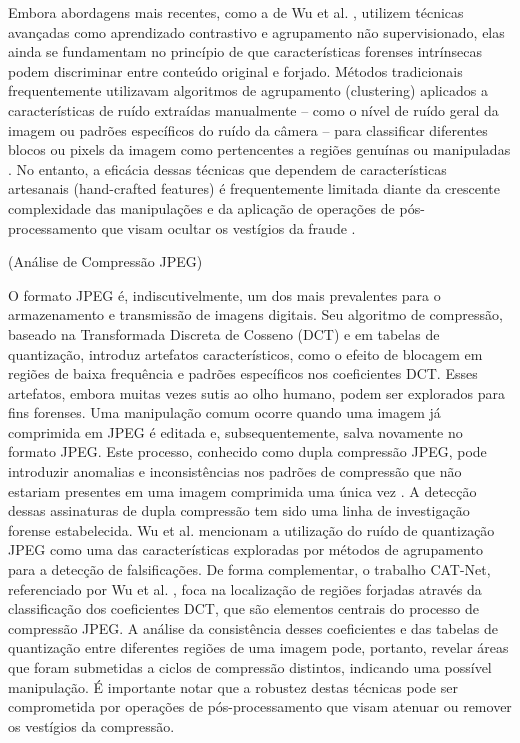 Embora abordagens mais recentes, como a de Wu et al. \cite{wu2023rethinking}, utilizem técnicas avançadas como aprendizado contrastivo e agrupamento não supervisionado, elas ainda se fundamentam no princípio de que características forenses intrínsecas podem discriminar entre conteúdo original e forjado. Métodos tradicionais frequentemente utilizavam algoritmos de agrupamento (clustering) aplicados a características de ruído extraídas manualmente – como o nível de ruído geral da imagem ou padrões específicos do ruído da câmera – para classificar diferentes blocos ou pixels da imagem como pertencentes a regiões genuínas ou manipuladas \cite{wu2023rethinking}. No entanto, a eficácia dessas técnicas que dependem de características artesanais (hand-crafted features) é frequentemente limitada diante da crescente complexidade das manipulações e da aplicação de operações de pós-processamento que visam ocultar os vestígios da fraude \cite{wu2023rethinking}.

\subsubsubsection(Análise de Compressão JPEG)

O formato JPEG é, indiscutivelmente, um dos mais prevalentes para o armazenamento e transmissão de imagens digitais. Seu algoritmo de compressão, baseado na Transformada Discreta de Cosseno (DCT) e em tabelas de quantização, introduz artefatos característicos, como o efeito de blocagem em regiões de baixa frequência e padrões específicos nos coeficientes DCT. Esses artefatos, embora muitas vezes sutis ao olho humano, podem ser explorados para fins forenses. Uma manipulação comum ocorre quando uma imagem já comprimida em JPEG é editada e, subsequentemente, salva novamente no formato JPEG. Este processo, conhecido como dupla compressão JPEG, pode introduzir anomalias e inconsistências nos padrões de compressão que não estariam presentes em uma imagem comprimida uma única vez \cite{zhou2018manipulation}. A detecção dessas assinaturas de dupla compressão tem sido uma linha de investigação forense estabelecida. Wu et al. \cite{wu2023rethinking} mencionam a utilização do ruído de quantização JPEG como uma das características exploradas por métodos de agrupamento para a detecção de falsificações. De forma complementar, o trabalho CAT-Net, referenciado por Wu et al. \cite{wu2023rethinking}, foca na localização de regiões forjadas através da classificação dos coeficientes DCT, que são elementos centrais do processo de compressão JPEG. A análise da consistência desses coeficientes e das tabelas de quantização entre diferentes regiões de uma imagem pode, portanto, revelar áreas que foram submetidas a ciclos de compressão distintos, indicando uma possível manipulação. É importante notar que a robustez destas técnicas pode ser comprometida por operações de pós-processamento que visam atenuar ou remover os vestígios da compressão.


